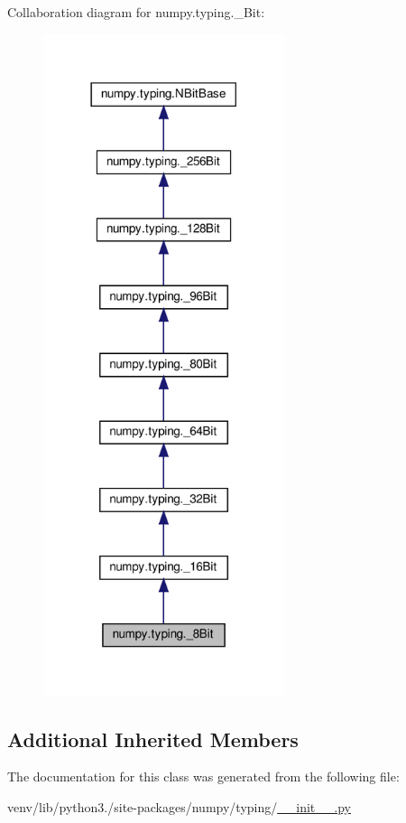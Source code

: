 Collaboration diagram for numpy.\+typing.\+\_\+Bit\+:
\nopagebreak
\begin{figure}[H]
\begin{center}
\leavevmode
\includegraphics[width=200pt]{classnumpy_1_1typing_1_1__8Bit__coll__graph}
\end{center}
\end{figure}
\subsection*{Additional Inherited Members}


The documentation for this class was generated from the following file\+:\begin{DoxyCompactItemize}
\item 
venv/lib/python3./site-\/packages/numpy/typing/\hyperlink{venv_2lib_2python3_89_2site-packages_2numpy_2typing_2____init_____8py}{\+\_\+\+\_\+init\+\_\+\+\_\+.\+py}\end{DoxyCompactItemize}
